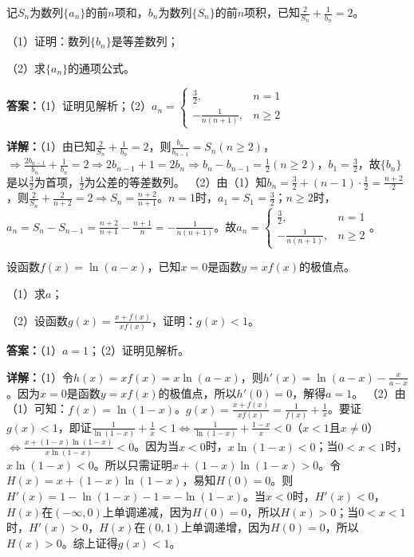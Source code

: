 \begin{question}[points=12]
记$S_n$为数列$\{a_n\}$的前$n$项和，$b_n$为数列$\{S_n\}$的前$n$项积，已知$\frac{2}{S_n}+\frac{1}{b_n}=2$。

（1）证明：数列$\{b_n\}$是等差数列；

（2）求$\{a_n\}$的通项公式。
\begin{solution}
\textbf{答案：}（1）证明见解析；（2）$a_n=\begin{cases}\frac32,&n=1\\ -\frac{1}{n(n+1)},&n\geq2\end{cases}$

\textbf{详解：}（1）由已知$\frac{2}{S_n}+\frac{1}{b_n}=2$，则$\frac{b_n}{b_{n-1}}=S_n(n\geq2)$，$\Rightarrow\frac{2b_{n-1}}{b_n}+\frac{1}{b_n}=2\Rightarrow 2b_{n-1}+1=2b_n\Rightarrow b_n-b_{n-1}=\frac12(n\geq2)$，$b_1=\frac32$，故$\{b_n\}$是以$\frac32$为首项，$\frac12$为公差的等差数列。
（2）由（1）知$b_n=\frac32+(n-1)\cdot\frac12=\frac{n+2}{2}$，则$\frac{2}{S_n}+\frac{2}{n+2}=2\Rightarrow S_n=\frac{n+2}{n+1}$。$n=1$时，$a_1=S_1=\frac32$；$n\geq2$时，$a_n=S_n-S_{n-1}=\frac{n+2}{n+1}-\frac{n+1}{n}=-\frac{1}{n(n+1)}$。故$a_n=\begin{cases}\frac32,&n=1\\ -\frac{1}{n(n+1)},&n\geq2\end{cases}$。
\end{solution}
\end{question}

\begin{question}[points=12]
设函数$f(x)=\ln(a-x)$，已知$x=0$是函数$y=xf(x)$的极值点。

（1）求$a$；

（2）设函数$g(x)=\frac{x+f(x)}{xf(x)}$，证明：$g(x)<1$。
\begin{solution}
\textbf{答案：}（1）$a=1$；（2）证明见解析。

\textbf{详解：}（1）令$h(x)=xf(x)=x\ln(a-x)$，则$h'(x)=\ln(a-x)-\frac{x}{a-x}$。因为$x=0$是函数$y=xf(x)$的极值点，所以$h'(0)=0$，解得$a=1$。
（2）由（1）可知：$f(x)=\ln(1-x)$。$g(x)=\frac{x+f(x)}{xf(x)}=\frac{1}{f(x)}+\frac{1}{x}$。要证$g(x)<1$，即证$\frac{1}{\ln(1-x)}+\frac{1}{x}<1\Leftrightarrow\frac{1}{\ln(1-x)}+\frac{1-x}{x}<0$（$x<1$且$x\neq0$）$\Leftrightarrow\frac{x+(1-x)\ln(1-x)}{x\ln(1-x)}<0$。因为当$x<0$时，$x\ln(1-x)<0$；当$0<x<1$时，$x\ln(1-x)<0$。所以只需证明$x+(1-x)\ln(1-x)>0$。令$H(x)=x+(1-x)\ln(1-x)$，易知$H(0)=0$。则$H'(x)=1-\ln(1-x)-1=-\ln(1-x)$。当$x<0$时，$H'(x)<0$，$H(x)$在$(-\infty,0)$上单调递减，因为$H(0)=0$，所以$H(x)>0$；当$0<x<1$时，$H'(x)>0$，$H(x)$在$(0,1)$上单调递增，因为$H(0)=0$，所以$H(x)>0$。综上证得$g(x)<1$。
\end{solution}
\end{question}

